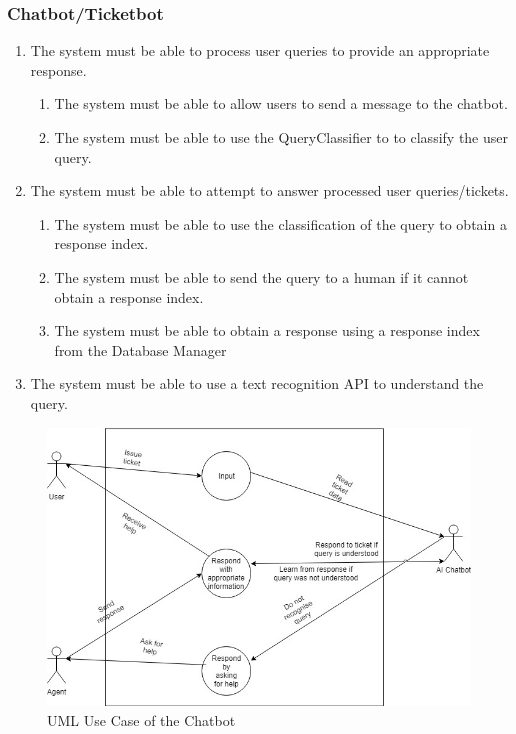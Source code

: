 \documentclass[11pt]{article}
\begin{document}
\subsubsection{Chatbot/Ticketbot}
\begin{enumerate}[label=R3.\arabic*.]
	\item The system must be able to process user queries to provide an appropriate response.
	\begin{enumerate}[label*=\arabic*.]
		\item The system must be able to allow users to send a message to the chatbot.
		\item The system must be able to use the QueryClassifier to to classify the user query.
	\end{enumerate}
	\item The system must be able to attempt to answer processed user queries/tickets.
	      \begin{enumerate}[label*=\arabic*.]
	      	\item The system must be able to use the classification of the query to obtain a response index.
		\item The system must be able to send the query to a human if it cannot obtain a response index.
		\item The system must be able to obtain a response using a response index from the Database Manager
	      \end{enumerate}
	\item The system must be able to use a text recognition API to understand the query.
\end{enumerate}

\begin{figure}[H]
	\centering
	\includegraphics[width=1.0\textwidth]{../../images/AI_Chatbot_UCD.jpg}
	\caption{UML Use Case of the Chatbot}
\end{figure}
\end{document}
